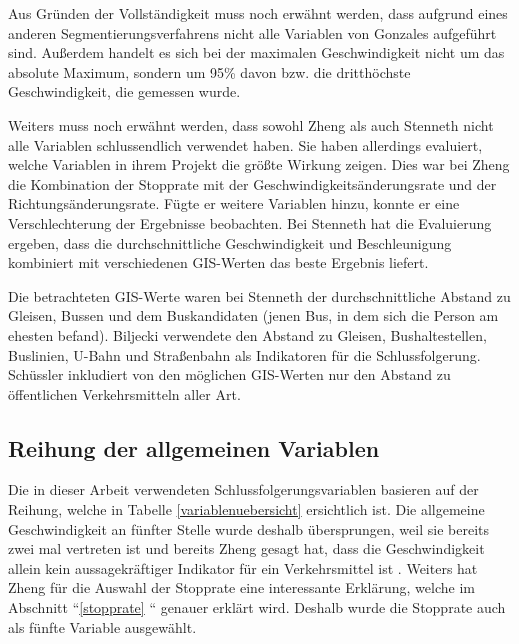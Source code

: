 Aus Gründen der Vollständigkeit muss noch erwähnt werden, dass aufgrund eines anderen Segmentierungsverfahrens nicht alle Variablen von Gonzales  \cite{gonzalez_automating_2010} aufgeführt sind. Außerdem handelt es sich bei der maximalen Geschwindigkeit nicht um das absolute Maximum, sondern um 95\% davon bzw. die dritthöchste Geschwindigkeit, die gemessen wurde. 

Weiters muss noch erwähnt werden, dass sowohl Zheng  \cite{zheng_understanding_2010} als auch Stenneth \cite{stenneth_transportation_2011} nicht alle Variablen schlussendlich verwendet haben. Sie haben allerdings evaluiert, welche Variablen in ihrem Projekt die größte Wirkung zeigen. Dies war bei Zheng \cite{zheng_understanding_2010} die Kombination der Stopprate mit der Geschwindigkeitsänderungsrate und der Richtungsänderungsrate. Fügte er weitere Variablen hinzu, konnte er eine Verschlechterung der Ergebnisse beobachten. Bei Stenneth \cite{stenneth_transportation_2011} hat die Evaluierung ergeben, dass die durchschnittliche Geschwindigkeit und Beschleunigung kombiniert mit verschiedenen GIS-Werten das beste Ergebnis liefert. 

Die betrachteten GIS-Werte waren bei Stenneth \cite{stenneth_transportation_2011} der durchschnittliche Abstand zu Gleisen, Bussen und dem Buskandidaten (jenen Bus, in dem sich die Person am ehesten befand). Biljecki verwendete den Abstand zu Gleisen, Bushaltestellen, Buslinien, U-Bahn und Straßenbahn als Indikatoren für die Schlussfolgerung. Schüssler \cite{nadine_schussler_improving_2011} inkludiert von den möglichen GIS-Werten nur den Abstand zu öffentlichen Verkehrsmitteln aller Art.

\subsection{Reihung der allgemeinen Variablen}
Die in dieser Arbeit verwendeten Schlussfolgerungsvariablen basieren auf der Reihung, welche in Tabelle \ref{variablenuebersicht} ersichtlich ist. Die allgemeine Geschwindigkeit an fünfter Stelle wurde deshalb übersprungen, weil sie bereits zwei mal vertreten ist und bereits Zheng gesagt hat, dass die Geschwindigkeit allein kein aussagekräftiger Indikator für ein Verkehrsmittel ist \cite{zheng_understanding_2010}. Weiters hat Zheng für die Auswahl der Stopprate eine interessante Erklärung, welche im Abschnitt ``\ref{stopprate} `` genauer erklärt wird. Deshalb wurde die Stopprate auch als fünfte Variable ausgewählt. 

